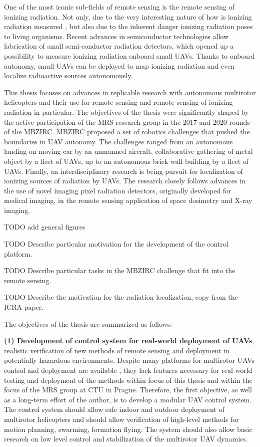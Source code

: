 \documentclass[a4paper,11pt,titlepage,twoside]{book}
\newcommand{\todo}[1]{{\color{red} TODO {#1}}}
\begin{document}
One of the most iconic sub-fields of remote sensing is the remote sensing of ionizing radiation.
Not only, due to the very interesting nature of how is ionizing radiation measured \cite{andreo2017fundamentals}, but also due to the inherent danger ionizing radiation poses to living organisms.
Recent advances in semiconductor technologies allow fabrication of small semi-conductor radiation detectors, which opened up a possibility to measure ionizing radiation onboard small \acp{UAV}.
Thanks to onboard autonomy, small \acp{UAV} can be deployed to map ionizing radiation and even localize radioactive sources autonomously.

This thesis focuses on advances in replicable research with autonomous multirotor helicopters and their use for remote sensing and remote sensing of ionizing radiation in particular.
The objectives of the thesis were significantly shaped by the active participation of the \ac{MRS} research group in the 2017 and 2020 rounds of the \ac{MBZIRC}.
MBZIRC proposed a set of robotics challenges that pushed the boundaries in \ac{UAV} autonomy.
The challenges ranged from an autonomous landing on moving car by an unmanned aircraft, collaborative gathering of metal object by a fleet of \acp{UAV}, up to an autonomous brick wall-building by a fleet of \acp{UAV}.
Finally, an interdisciplinary research is being pursuit for localization of ionizing sources of radiation by \acp{UAV}.
The research closely follows advances in the use of novel imaging pixel radiation detectors, originally developed for medical imaging, in the remote sensing application of space dosimetry and X-ray imaging.

\todo{add general figures}

\todo{Describe particular motivation for the development of the control platform.}

\todo{Describe particular tasks in the MBZIRC challenge that fit into the remote sensing.}

\todo{Describe the motivation for the radiation localization, copy from the ICRA paper.}

The objectives of the thesis are summarized as follows:

\textbf{(1) Development of control system for real-world deployment of \acp{UAV}}, realistic verification of new methods of remote sensing and deployment in potentially hazardous environments.
Despite many platforms for multirotor \acp{UAV} control and deployment are available \cite{sanchez2016aerostack, xiao2020xtdrone, furrer2016rotors, schmittle2018openuav, abeywardena2015design, mellado2013mavwork}, they lack features necessary for real-world testing and deployment of the methods within focus of this thesis and within the focus of the \acl{MRS} group at \ac{CTU} in Prague.
Therefore, the first objective, as well as a long-term effort of the author, is to develop a modular \ac{UAV} control system.
The control system should allow safe indoor and outdoor deployment of multirotor helicopters and should allow verification of high-level methods for motion planning, swarming, formation flying.
The system should also allow basic research on low level control and stabilization of the multirotor \ac{UAV} dynamics.
\end{document}
